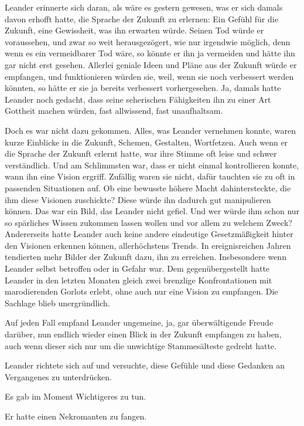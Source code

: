 Leander erinnerte sich daran, als wäre es gestern gewesen, was er sich damals davon erhofft hatte, die Sprache der Zukunft zu erlernen: Ein Gefühl für die Zukunft, eine Gewissheit, was ihn erwarten würde. Seinen Tod würde er voraussehen, und zwar so weit herausgezögert, wie nur irgendwie möglich, denn wenn es ein vermeidbarer Tod wäre, so könnte er ihn ja vermeiden und hätte ihn gar nicht erst gesehen. Allerlei geniale Ideen und Pläne aus der Zukunft würde er empfangen, und funktionieren würden sie, weil, wenn sie noch verbessert werden könnten, so hätte er sie ja bereits verbessert vorhergesehen. Ja, damals hatte Leander noch gedacht, dass seine seherischen Fähigkeiten ihn zu einer Art Gottheit machen würden, fast allwissend, fast unaufhaltsam.

Doch es war nicht dazu gekommen. Alles, was Leander vernehmen konnte, waren kurze Einblicke in die Zukunft, Schemen, Gestalten, Wortfetzen. Auch wenn er die Sprache der Zukunft erlernt hatte, war ihre Stimme oft leise und schwer verständlich. Und am Schlimmsten war, dass er nicht einmal kontrollieren konnte, wann ihn eine Vision ergriff. Zufällig waren sie nicht, dafür tauchten sie zu oft in passenden Situationen auf. Ob eine bewusste höhere Macht dahintersteckte, die ihm diese Visionen zuschickte? Diese würde ihn dadurch gut manipulieren können. Das war ein Bild, das Leander nicht gefiel. Und wer würde ihm schon nur so spärliches Wissen zukommen lassen wollen und vor allem zu welchem Zweck? Andererseits hatte Leander auch keine andere eindeutige Gesetzmäßigkeit hinter den Visionen erkennen können, allerhöchstens Trends. In ereignisreichen Jahren tendierten mehr Bilder der Zukunft dazu, ihn zu erreichen. Insbesondere wenn Leander selbst betroffen oder in Gefahr war. Dem gegenübergestellt hatte Leander in den letzten Monaten gleich zwei brenzlige Konfrontationen mit marodierenden Gorlots erlebt, ohne auch nur eine Vision zu empfangen. Die Sachlage blieb unergründlich.

Auf jeden Fall empfand Leander ungemeine, ja, gar überwältigende Freude darüber, nun endlich wieder einen Blick in der Zukunft empfangen zu haben, auch wenn dieser sich nur um die unwichtige Stammesälteste gedreht hatte.

Leander richtete sich auf und versuchte, diese Gefühle und diese Gedanken an Vergangenes zu unterdrücken.

Es gab im Moment Wichtigeres zu tun.

Er hatte einen Nekromanten zu fangen.











